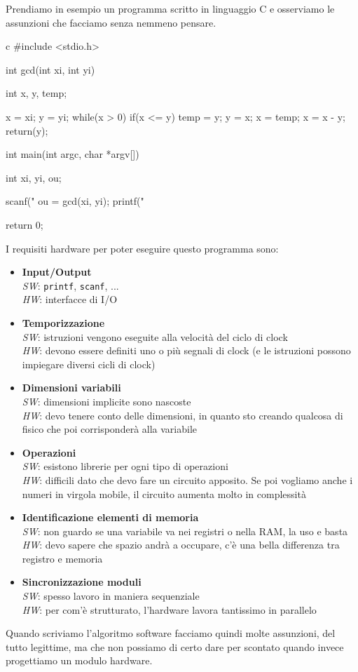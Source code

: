 \documentclass[10pt,a4paper,oneside]{scrbook}
\begin{document}
Prendiamo in esempio un programma scritto in linguaggio C e osserviamo le assunzioni che facciamo senza nemmeno pensare.\\
\begin{sourcecode}{c}
#include <stdio.h>

int gcd(int xi, int yi){
   	int x, y, temp;
   	
   	x = xi;
   	y = yi;
   	while(x > 0){
   		if(x <= y){
   			temp = y;
   			y = x;
   			x = temp;
   		}
   		x = x - y;
   	}
   	return(y);
}

int main(int argc, char *argv[]){
   	int xi, yi, ou;
    
    scanf("%
    ou = gcd(xi, yi);
    printf("%
    
    return 0;
}
\end{sourcecode}
I requisiti hardware per poter eseguire questo programma sono:
\begin{itemize}
    \item \textbf{Input/Output}\\
    \textit{SW}: \texttt{printf}, \texttt{scanf}, ...\\
    \textit{HW}: interfacce di I/O
    \item \textbf{Temporizzazione}\\
    \textit{SW}: istruzioni vengono eseguite alla velocità del ciclo di clock\\
    \textit{HW}: devono essere definiti uno o più segnali di clock (e le istruzioni possono impiegare diversi cicli di clock)
    \item \textbf{Dimensioni variabili}\\
    \textit{SW}: dimensioni implicite sono nascoste\\
    \textit{HW}: devo tenere conto delle dimensioni, in quanto sto creando qualcosa di fisico che poi corrisponderà alla variabile
    \item \textbf{Operazioni}\\
    \textit{SW}: esistono librerie per ogni tipo di operazioni\\
    \textit{HW}: difficili dato che devo fare un circuito apposito. Se poi vogliamo anche i numeri in virgola mobile, il circuito aumenta molto in complessità
    \item \textbf{Identificazione elementi di memoria}\\
    \textit{SW}: non guardo se una variabile va nei registri o nella RAM, la uso e basta\\
    \textit{HW}: devo sapere che spazio andrà a occupare, c'è una bella differenza tra registro e memoria
    \item \textbf{Sincronizzazione moduli}\\
    \textit{SW}: spesso lavoro in maniera sequenziale\\
    \textit{HW}: per com'è strutturato, l'hardware lavora tantissimo in parallelo        
\end{itemize}
Quando scriviamo l'algoritmo software facciamo quindi molte assunzioni, del tutto legittime, ma che non possiamo di certo dare per 
scontato quando invece progettiamo un modulo hardware.
\end{document}
